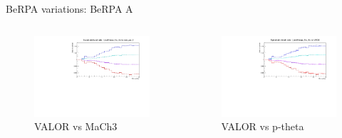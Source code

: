 \documentclass{beamer}
\begin{document}
\begin{frame}{BeRPA variations: BeRPA A}
	\centering
	\begin{columns}
		\begin{column}{0.5\paperwidth}
			\begin{figure}
				\includegraphics[page=7, trim={0cm 0cm 0cm 0cm}, clip, scale=0.35] {images/variations/valor_mach3/variations_prebanff_unosc_1Re}
				\caption{VALOR vs MaCh3}
			\end{figure}
		\end{column}
		\begin{column}{0.5\paperwidth}
			\begin{figure}
				\includegraphics[page=17, trim={0cm 0cm 0cm 0cm}, clip, scale=0.35] {images/variations/valor_ptheta/variations_prebanff_unosc_1Re}
				\caption{VALOR vs p-theta}
			\end{figure}
		\end{column}
	\end{columns}
\end{frame}
\end{document}
